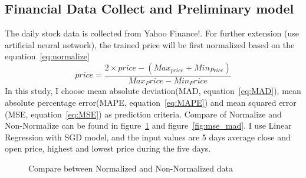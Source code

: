 \documentclass[12pt,a4paper]{scrartcl}
\begin{document}
	\subsection{Financial Data Collect and Preliminary model}
	The daily stock data is collected from Yahoo Finance!. For further extension (use artificial neural network\cite{nayak2014impact}), the trained price will be first normalized based on the equation~\ref{eq:normalize}
	\begin{equation}
		\label{eq:normalize}
		price = \frac{2\times price - (Max_{price}+Min_{Price})}{Max_Price-Min_Price}
	\end{equation}
	In this study, I choose mean absolute deviation(MAD, equation~\ref{eq:MAD}), mean absolute percentage error(MAPE, equation~\ref{eq:MAPE}) and mean squared error (MSE, equation~\ref{eq:MSE}) as prediction criteria.
	Compare of Normalize and Non-Normalize can be found in figure~\ref{fig:non_vs_nor} and figure~\ref{fig:mse_mad}. I use Linear Regression with SGD model, and the input values are 5 days average close and open price, highest and lowest price during the five days. 
	\begin{figure}[ht]
		\centering
		\caption{Compare between Normalized and Non-Normalized data}
		\label{fig:non_vs_nor}
	\end{figure}
\end{document}
